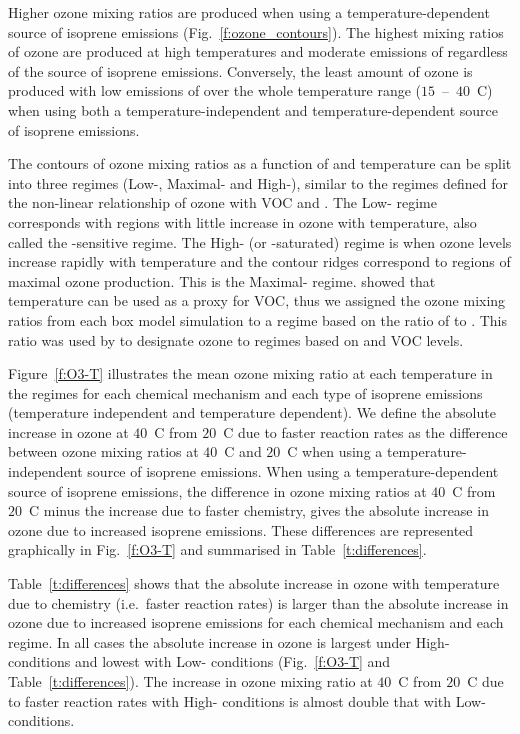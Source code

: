 Higher ozone mixing ratios are produced when using a temperature-dependent source of isoprene emissions (Fig.~\ref{f:ozone_contours}).
The highest mixing ratios of ozone are produced at high temperatures and moderate emissions of  regardless of the source of isoprene emissions.
Conversely, the least amount of ozone is produced with low emissions of  over the whole temperature range ($15$~--~$40$~\degree C) when using both a temperature-independent and temperature-dependent source of isoprene emissions.

The contours of ozone mixing ratios as a function of  and temperature can be split into three  regimes (Low-, Maximal- and High-), similar to the  regimes defined for the non-linear relationship of ozone with VOC and .
The Low- regime corresponds with regions with little increase in ozone with temperature, also called the -sensitive regime.
The High- (or -saturated) regime is when ozone levels increase rapidly with temperature and the contour ridges correspond to regions of maximal ozone production.
This is the Maximal- regime.
\citet{Pusede:2014} showed that temperature can be used as a proxy for VOC, thus we assigned the ozone mixing ratios from each box model simulation to a  regime based on the ratio of  to .
This ratio was used by \citet{Sillman:1995} to designate ozone to  regimes based on  and VOC levels.

Figure~\ref{f:O3-T} illustrates the mean ozone mixing ratio at each temperature in the  regimes for each chemical mechanism and each type of isoprene emissions (temperature independent and temperature dependent).  
We define the absolute increase in ozone at $40$~\degree C from $20$~\degree C due to faster reaction rates as the difference between ozone mixing ratios at $40$~\degree C and $20$~\degree C when using a temperature-independent source of isoprene emissions.
When using a temperature-dependent source of isoprene emissions, the difference in ozone mixing ratios at $40$~\degree C from $20$~\degree C minus the increase due to faster chemistry, gives the absolute increase in ozone due to increased isoprene emissions.
These differences are represented graphically in Fig.~\ref{f:O3-T} and summarised in Table~\ref{t:differences}.

Table~\ref{t:differences} shows that the absolute increase in ozone with temperature due to chemistry (i.e.~faster reaction rates) is larger than the absolute increase in ozone due to increased isoprene emissions for each chemical mechanism and each  regime.
In all cases the absolute increase in ozone is largest under High- conditions and lowest with Low- conditions (Fig.~\ref{f:O3-T} and Table~\ref{t:differences}).
The increase in ozone mixing ratio at $40$~\degree C from $20$~\degree C due to faster reaction rates with High- conditions is almost double that with Low- conditions.


